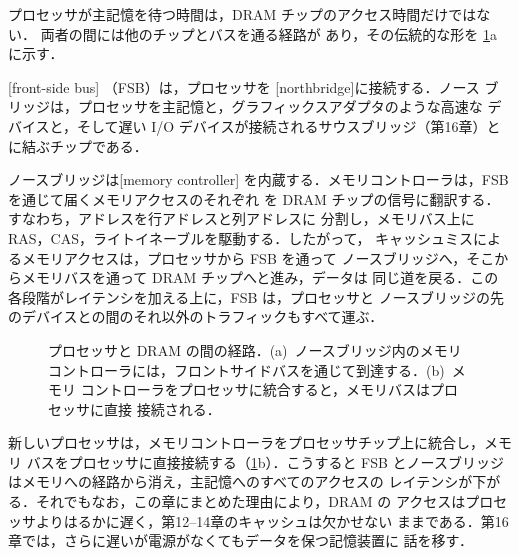 \documentclass[../main.tex]{subfiles}
\begin{document}
プロセッサが主記憶を待つ時間は，DRAM チップのアクセス時間だけではない．
両者の間には他のチップとバスを通る経路が
あり，その伝統的な形を \cref{fig:l15-connection}a に示す．

\begin{definition}[フロントサイドバスとノースブリッジ]
  [front-side bus]%
  （FSB）は，プロセッサを
  [northbridge]に接続する．ノース
  ブリッジは，プロセッサを主記憶と，グラフィックスアダプタのような高速な
  デバイスと，そして遅い I/O デバイスが接続されるサウスブリッジ（第16章）と
  に結ぶチップである．
\end{definition}

ノースブリッジは[memory controller]%
を内蔵する．メモリコントローラは，FSB を通じて届くメモリアクセスのそれぞれ
を DRAM チップの信号に翻訳する．すなわち，アドレスを行アドレスと列アドレスに
分割し，メモリバス上に RAS，CAS，ライトイネーブルを駆動する．したがって，
キャッシュミスによるメモリアクセスは，プロセッサから FSB を通って
ノースブリッジへ，そこからメモリバスを通って DRAM チップへと進み，データは
同じ道を戻る．この各段階がレイテンシを加える上に，FSB は，プロセッサと
ノースブリッジの先のデバイスとの間のそれ以外のトラフィックもすべて運ぶ．

\begin{figure}[htbp]
  \centering
  
  \caption{プロセッサと DRAM の間の経路．(a)~ノースブリッジ内のメモリ
    コントローラには，フロントサイドバスを通じて到達する．(b)~メモリ
    コントローラをプロセッサに統合すると，メモリバスはプロセッサに直接
    接続される．}
  \label{fig:l15-connection}
\end{figure}

新しいプロセッサは，メモリコントローラをプロセッサチップ上に統合し，メモリ
バスをプロセッサに直接接続する（\cref{fig:l15-connection}b）．こうすると
FSB とノースブリッジはメモリへの経路から消え，主記憶へのすべてのアクセスの
レイテンシが下がる．それでもなお，この章にまとめた理由により，DRAM の
アクセスはプロセッサよりはるかに遅く，第12--14章のキャッシュは欠かせない
ままである．第16章では，さらに遅いが電源がなくてもデータを保つ記憶装置に
話を移す．
\end{document}

